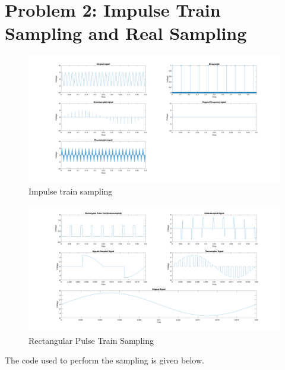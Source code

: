 \section{Problem 2: Impulse Train Sampling and Real Sampling}

\begin{figure}[H]
      \centering
      \includegraphics[width=\textwidth]{images/problem2_part1.png}
      \caption{Impulse train sampling}
      \label{fig:impulse_train_sampling}
\end{figure}

\begin{figure}[H]
      \centering
      \includegraphics[width=\textwidth]{images/problem2_part2.png}
      \caption{Rectangular Pulse Train Sampling}
\end{figure}

The code used to perform the sampling is given below.


